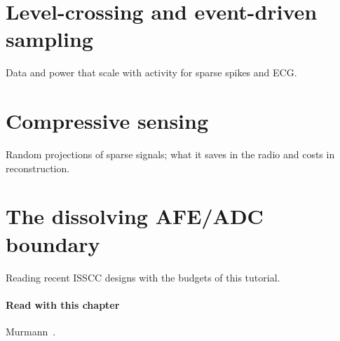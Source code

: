 \section{Level-crossing and event-driven sampling}\label{sec:ch21-3}
Data and power that scale with activity for sparse spikes and ECG.

\section{Compressive sensing}\label{sec:ch21-4}
Random projections of sparse signals; what it saves in the radio and costs in reconstruction.

\section{The dissolving AFE/ADC boundary}\label{sec:ch21-5}
Reading recent ISSCC designs with the budgets of this tutorial.

\paragraph{Read with this chapter} Murmann~\cite{murmannsurvey}.
